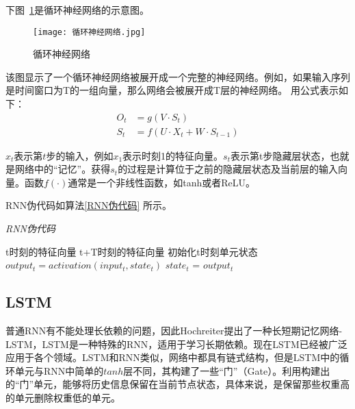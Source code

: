 
下图~\ref{fig:循环神经网络}是循环神经网络的示意图。
\begin{figure}
    \centering
    \texttt{[image: 循环神经网络.jpg]}
    \caption{循环神经网络}
    \label{fig:循环神经网络}
  \end{figure}
该图显示了一个循环神经网络被展开成一个完整的神经网络。例如，如果输入序列是时间窗口为T的一组向量，那么网络会被展开成T层的神经网络。
  用公式表示如下：
  \begin{equation}
      \begin{aligned}
          O_t &= g(V\cdot S_t) \\
          S_t &= f(U\cdot X_t + W\cdot S_{t-1})
      \end{aligned}
  \end{equation}

  $x_t$表示第$t$步的输入，例如$x_1$表示时刻1的特征向量。$s_t$表示第t步隐藏层状态，也就是网络中的“记忆”。获得$s_t$的过程是计算位于之前的隐藏层状态及当前层的输入向量。函数$f(\cdot)$通常是一个非线性函数，如tanh或者ReLU。

RNN伪代码如算法\ref{RNN伪代码} 所示。
  \begin{algorithm}[!h]
    \caption{\emph{RNN伪代码}}
    \label{RNN伪代码}
    \begin{algorithmic}[1]
      \Require t时刻的特征向量
      \Ensure t+T时刻的特征向量
      \State 初始化t时刻单元状态
        \State $output_t = activation(input_t, state_t)$
        \State $state_t$ = $output_t$
      \EndFor
    \end{algorithmic}
  \end{algorithm}

\subsection{LSTM}
普通RNN有不能处理长依赖的问题，因此Hochreiter提出了一种长短期记忆网络-LSTM，LSTM是一种特殊的RNN，适用于学习长期依赖。现在LSTM已经被广泛应用于各个领域。LSTM和RNN类似，网络中都具有链式结构，但是LSTM中的循环单元与RNN中简单的$tanh$层不同，其构建了一些“门”（Gate）。利用构建出的“门”单元，能够将历史信息保留在当前节点状态，具体来说，是保留那些权重高的单元删除权重低的单元。

